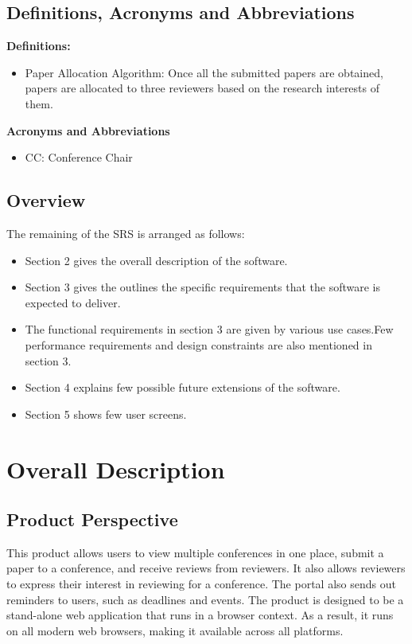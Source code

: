 \documentclass[english,a4paper,12pt]{report}
\begin{document}
\section{Definitions, Acronyms and Abbreviations}
\textbf{Definitions:}
\begin{itemize}
    \item Paper Allocation Algorithm: Once all the submitted papers are obtained, papers are allocated to three reviewers based on the research interests of them.
\end{itemize}
\textbf{Acronyms and Abbreviations}
\begin{itemize}
    \item CC: Conference Chair
\end{itemize}


\section{Overview}
The remaining of the SRS is arranged as follows:
\begin{itemize}
    \item Section 2 gives the overall description of the software.
    \item Section 3 gives the outlines the specific requirements that the software is expected to deliver.
    \item The functional requirements in section 3 are given by various use cases.Few performance requirements and design constraints are also mentioned in section 3.
    \item Section 4 explains few possible future extensions of the software.
    \item Section 5 shows few user screens.
\end{itemize}


\chapter{Overall Description}
\section{Product Perspective}
This product allows users to view multiple conferences in one place, submit a paper to a conference, and receive reviews from reviewers. It also allows reviewers to express their interest in reviewing for a conference. The portal also sends out reminders to users, such as deadlines and events. The product is designed to be a stand-alone web application that runs in a browser context. As a result, it runs on all modern web browsers, making it available across all platforms.
\end{document}
